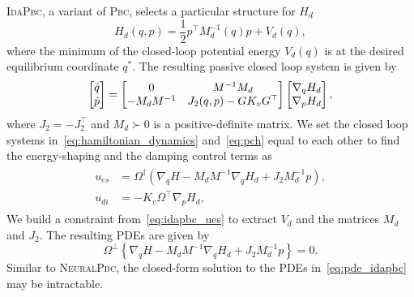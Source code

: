\textsc{IdaPbc}, a variant of \textsc{Pbc}, selects a particular structure for
$H_d$ 
\begin{equation}
  H_d(q, p) = \frac{1}{2} p^\top M_d^{-1}(q) p + V_d(q),
  \label{eq:idapbc_desired_hamiltonian}
\end{equation}
\noindent where the minimum of the closed-loop potential energy $V_d(q)$ is at
the desired equilibrium coordinate $q^*$.
%
The resulting passive closed loop system is given by~\cite{ortega2002stabilization}
\begin{equation}
  \begin{bmatrix}\dot{q} \\ \dot{p}\end{bmatrix}  =
  \begin{bmatrix}0 & M^{-1}M_d \\ -M_dM^{-1} & J_2(q,p) - GK_vG^\top\end{bmatrix}
  \begin{bmatrix}\nabla_q H_d \\ \nabla_p H_d\end{bmatrix},
  \label{eq:pch}
\end{equation}
where $J_2 = -J_2^\top$ and $M_d \succ 0$ is a positive-definite matrix.
%
We set the closed loop systems in~\eqref{eq:hamiltonian_dynamics}
and~\eqref{eq:pch} equal to each other to find the energy-shaping and the damping control terms as
\begin{align}
  \begin{split}
  u_{es} &= \Omega^{\dagger} \left(\nabla_qH - M_dM^{-1} \nabla_qH_d + J_2M_d^{-1}p\right), \\
  u_{di} &= -K_v \Omega^\top \nabla_p H_d,
  \end{split}
  \label{eq:idapbc_ues}
\end{align}
%
We build a constraint from~\eqref{eq:idapbc_ues} to extract $V_d$ and the
matrices $M_d$ and $J_2$. The resulting PDEs are given by 
\begin{equation}
  \Omega^\perp \left\{ \nabla_qH - M_dM^{-1} \nabla_qH_d + J_2M_d^{-1}p \right\} = 0.
  \label{eq:pde_idapbc}
\end{equation}
%
Similar to \textsc{NeuralPbc}, the closed-form solution to the PDEs
in~\eqref{eq:pde_idapbc} may be intractable. 

